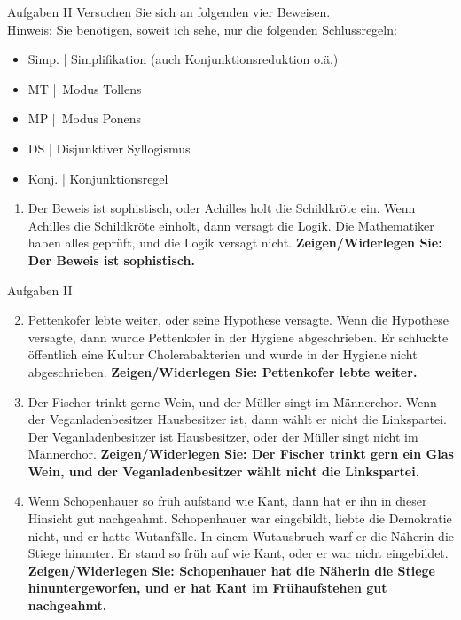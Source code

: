 \begin{frame}
  {Aufgaben II}
  Versuchen Sie sich an folgenden vier Beweisen.\\
  \Halbzeile
  Hinweis: Sie benötigen, soweit ich sehe, nur die folgenden Schlussregeln:
  \Viertelzeile
  \begin{itemize}\footnotesize
    \item Simp. | Simplifikation (auch Konjunktionsreduktion o.\"a.)
    \item MT | Modus Tollens
    \item MP | Modus Ponens
    \item DS | Disjunktiver Syllogismus
    \item Konj. | Konjunktionsregel
  \end{itemize}
  \Halbzeile
  \begin{enumerate}\footnotesize
    \item Der Beweis ist sophistisch, oder Achilles holt die Schildkr\"ote ein. Wenn Achilles die Schildkr\"ote einholt, dann versagt die Logik. Die Mathematiker haben alles gepr\"uft, und die Logik versagt nicht. \textbf{Zeigen/Widerlegen Sie: Der Beweis ist sophistisch.}
  \end{enumerate}
\end{frame}

\begin{frame}
  {Aufgaben II}
  \begin{enumerate}\setcounter{enumi}{1}\footnotesize
    \item Pettenkofer lebte weiter, oder seine Hypothese versagte. Wenn die Hypothese versagte, dann wurde Pettenkofer in der Hygiene abgeschrieben. Er schluckte \"offentlich eine Kultur Cholerabakterien und wurde in der Hygiene nicht abgeschrieben. \textbf{Zeigen/Widerlegen Sie: Pettenkofer lebte weiter.}
    \item Der Fischer trinkt gerne Wein, und der M\"uller singt im M\"annerchor. Wenn der Veganladenbesitzer Hausbesitzer ist, dann w\"ahlt er nicht die Linkspartei. Der Veganladenbesitzer ist Hausbesitzer, oder der M\"uller singt nicht im M\"annerchor. \textbf{Zeigen/Widerlegen Sie: Der Fischer trinkt gern ein Glas Wein, und der Veganladenbesitzer w\"ahlt nicht die Linkspartei.}
    \item Wenn Schopenhauer so fr\"uh aufstand wie Kant, dann hat er ihn in dieser Hinsicht gut nachgeahmt. Schopenhauer war eingebildt, liebte die Demokratie nicht, und er hatte Wutanf\"alle. In einem Wutausbruch warf er die N\"aherin die Stiege hinunter. Er stand so fr\"uh auf wie Kant, oder er war nicht eingebildet. \textbf{Zeigen/Widerlegen Sie: Schopenhauer hat die N\"aherin die Stiege hinuntergeworfen, und er hat Kant im Fr\"uhaufstehen gut nachgeahmt.}
  \end{enumerate}
\end{frame}

